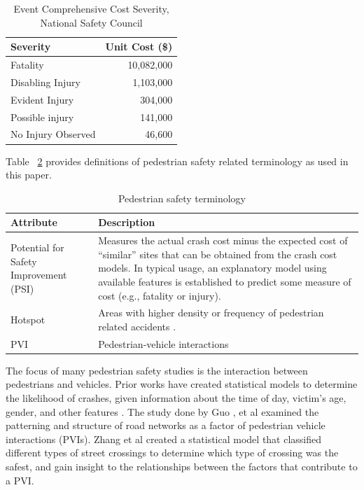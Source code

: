 \documentclass{llncs}
\begin{document}
%
\FloatBarrier
\begin{table}[!h]
\begin{center}
\caption{Event Comprehensive Cost Severity, National Safety Council}
\label{table:eventseverity}
\begin{tabular}{lr}
\hline
\rule{0pt}{12pt}
Severity & Unit Cost (\$)\\[2pt]
\hline
Fatality 			&10,082,000\\
Disabling Injury 		&1,103,000\\
Evident Injury 		&304,000\\
Possible injury 		&141,000\\
No Injury Observed		&46,600\\[2pt]
\hline
\end{tabular}
\end{center}
\end{table}
\FloatBarrier
%
Table ~\ref{table:terminology} provides definitions of  pedestrian safety related terminology as used in this paper.
%
\FloatBarrier
\begin{table}[!ht]
\caption{Pedestrian safety terminology}
\label{table:terminology}
\begin{center}
\begin{tabular}{ p{}  p{} }
\hline
\rule{0pt}{12pt}
Attribute & Description\\[2pt]
\hline
Potential for Safety Improvement (PSI)	&	Measures the actual crash cost minus the expected cost of “similar” sites that can be obtained from the crash cost models. In typical usage, an explanatory model using available features is established to predict some measure of cost (e.g., fatality or injury). \cite{ohgov2017} \\		
Hotspot & Areas with higher density or frequency of pedestrian related accidents \cite{xie2017analysis}. 	\\
PVI & Pedestrian-vehicle interactions \\	[2pt]
\hline
\end{tabular}
\end{center}	
\end{table}
\FloatBarrier	

The focus of many pedestrian safety studies is the interaction between pedestrians and vehicles. Prior works have created statistical models to determine the likelihood of crashes, given information about the time of day, victim's age, gender, and other features \cite{brude1993models} \cite{lascala2000demographic} \cite{lyon2002pedestrian} \cite{ladron2004forecasting} \cite{pulugurtha2011pedestrian} \cite{ukkusuri2011random}. The study done by Guo \cite{guo2017effect}, et al examined the patterning and structure of road networks as a factor of pedestrian vehicle interactions (PVIs). Zhang et al \cite{zhang2017quantitative} created a statistical model that classified different types of street crossings to determine which type of crossing was the safest, and gain insight to the relationships between the factors that contribute to a PVI. 
\end{document}
